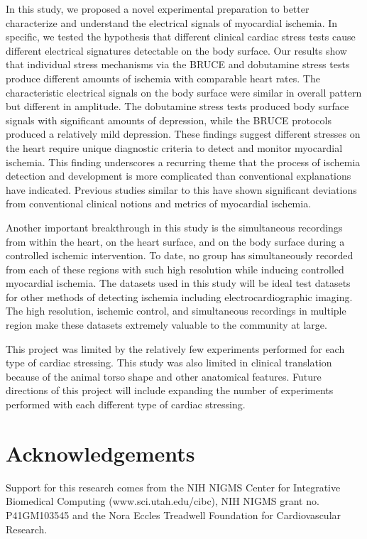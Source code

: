 \documentclass[twocolumn]{cinc}
\begin{document}
In this study, we proposed a novel experimental preparation to better characterize and understand the electrical signals of myocardial ischemia. In specific, we tested the hypothesis that different clinical cardiac stress tests cause different electrical signatures detectable on the body surface. Our results show that individual stress mechanisms via the BRUCE and dobutamine stress tests produce different amounts of ischemia with comparable heart rates. The characteristic electrical signals on the body surface were similar in overall pattern but different in amplitude. The dobutamine stress tests produced body surface signals with significant amounts of depression, while the BRUCE protocols produced a relatively mild depression. These findings suggest different stresses on the heart require unique diagnostic criteria to detect and monitor myocardial ischemia. This finding underscores a recurring theme that the process of ischemia detection and development is more complicated than conventional explanations have indicated. Previous studies similar to this have shown significant deviations from conventional clinical notions and metrics of myocardial ischemia. 

Another important breakthrough in this study is the simultaneous recordings from within the heart, on the heart surface, and on the body surface during a controlled ischemic intervention. To date, no group has simultaneously recorded from each of these regions with such high resolution while inducing controlled myocardial ischemia. The datasets used in this study will be ideal test datasets for other methods of detecting ischemia including electrocardiographic imaging. The high resolution, ischemic control, and simultaneous recordings in multiple region make these datasets extremely valuable to the community at large. 

This project was limited by the relatively few experiments performed for each type of cardiac stressing. This study was also limited in clinical translation because of the animal torso shape and other anatomical features. Future directions of this project will include expanding the number of experiments performed with each different type of cardiac stressing. 


\balance


\section*{Acknowledgements}  
% 
Support for this research comes from the NIH NIGMS Center for Integrative
Biomedical Computing (www.sci.utah.edu/cibc), NIH NIGMS grant
no. P41GM103545 and the Nora Eccles Treadwell Foundation for Cardiovascular Research.
\end{document}
